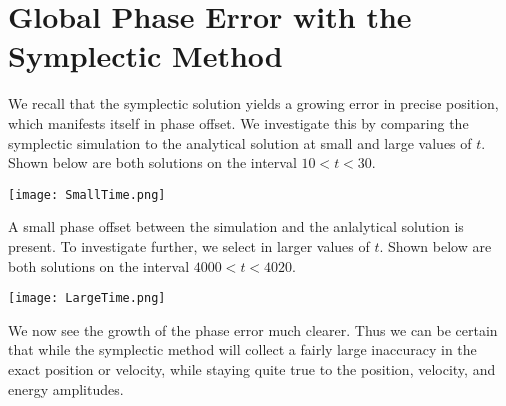 \documentclass{scrartcl}
\begin{document}
\section{Global Phase Error with the Symplectic Method}
We recall that the symplectic solution yields a growing error in precise position, which manifests itself in phase offset. We investigate this by comparing the symplectic simulation to the analytical solution at small and large values of $t$. Shown below are both solutions on the interval $10<t<30$.
\begin{center}
\texttt{[image: SmallTime.png]}
\end{center}
A small phase offset between the simulation and the anlalytical solution is present. To investigate further, we select in larger values of $t$. Shown below are both solutions on the interval $4000<t<4020$.
\begin{center}
\texttt{[image: LargeTime.png]}
\end{center}
We now see the growth of the phase error much clearer. Thus we can be certain that while the symplectic method will collect a fairly large inaccuracy in the exact position or velocity, while staying quite true to the position, velocity, and energy amplitudes.
\end{document}

